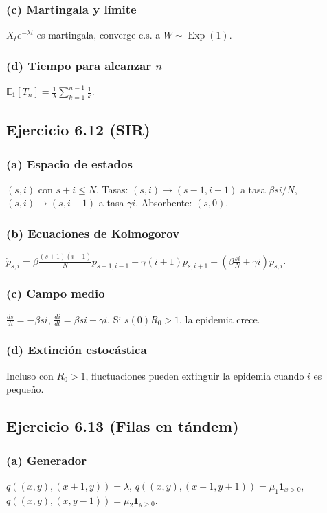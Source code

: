 \documentclass[12pt]{article}
\newcommand{\E}{\mathbb{E}}
\newcommand{\1}{\mathbf{1}}
\newcommand{\Exp}{\operatorname{Exp}}
\begin{document}
\subsubsection*{(c) Martingala y l\'imite}
$X_t e^{-\lambda t}$ es martingala, converge c.s. a $W\sim\Exp(1)$.

\subsubsection*{(d) Tiempo para alcanzar $n$}
$\E_1[T_n]=\frac1\lambda\sum_{k=1}^{n-1}\frac1k$.

\subsection{Ejercicio 6.12 (SIR)}

\subsubsection*{(a) Espacio de estados}
$(s,i)$ con $s+i\le N$. Tasas: $(s,i)\to(s-1,i+1)$ a tasa $\beta s i/N$, $(s,i)\to(s,i-1)$ a tasa $\gamma i$. Absorbente: $(s,0)$.

\subsubsection*{(b) Ecuaciones de Kolmogorov}
$\dot{p}_{s,i}=\beta\frac{(s+1)(i-1)}{N}p_{s+1,i-1}+\gamma(i+1)p_{s,i+1}-\left(\beta\frac{s i}{N}+\gamma i\right)p_{s,i}$.

\subsubsection*{(c) Campo medio}
$\frac{ds}{dt}=-\beta s i$, $\frac{di}{dt}=\beta s i-\gamma i$. Si $s(0)R_0>1$, la epidemia crece.

\subsubsection*{(d) Extinci\'on estoc\'astica}
Incluso con $R_0>1$, fluctuaciones pueden extinguir la epidemia cuando $i$ es peque\~no.

\subsection{Ejercicio 6.13 (Filas en t\'andem)}

\subsubsection*{(a) Generador}
$q((x,y),(x+1,y))=\lambda$, $q((x,y),(x-1,y+1))=\mu_1\1_{x>0}$, $q((x,y),(x,y-1))=\mu_2\1_{y>0}$.
\end{document}
